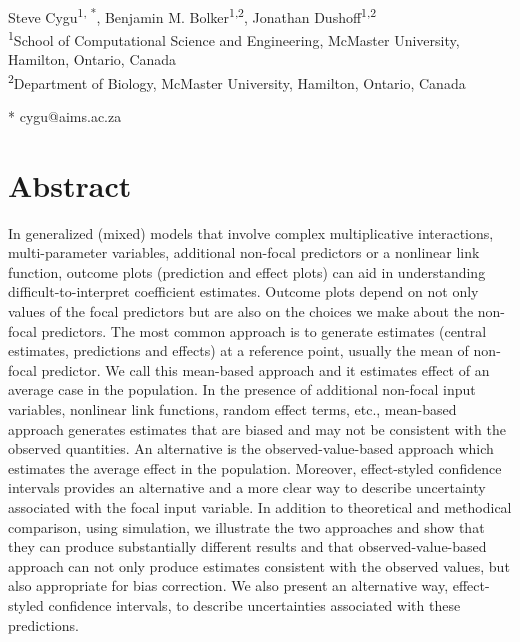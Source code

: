 \begin{flushleft}
{\Large
\textbf{} %
}
\newline
\\
Steve Cygu\textsuperscript{1, *},
Benjamin M. Bolker\textsuperscript{1,2},
Jonathan Dushoff\textsuperscript{1,2}
\\
\bigskip
\textsuperscript{1}School of Computational Science and Engineering, McMaster University, Hamilton, Ontario, Canada
\\
\textsuperscript{2}Department of Biology, McMaster University, Hamilton, Ontario, Canada
\\
\bigskip


* cygu@aims.ac.za

\end{flushleft}
\section*{Abstract}


In generalized (mixed) models that involve complex multiplicative interactions, multi-parameter variables, additional non-focal predictors or a nonlinear link function, outcome plots (prediction and effect plots) can aid in understanding difficult-to-interpret coefficient estimates. Outcome plots depend on not only values of the focal predictors but are also on the choices we make about the non-focal predictors.
The most common approach is to generate estimates (central estimates, predictions and effects) at a reference point, usually the mean of non-focal predictor. We call this mean-based approach and it estimates effect of an average case in the population. In the presence of additional non-focal input variables, nonlinear link functions, random effect terms, etc., mean-based approach generates estimates that are biased and may not be consistent with the observed quantities. An alternative is the observed-value-based approach which estimates the average effect in the population. Moreover, effect-styled confidence intervals provides an alternative and a more clear way to describe uncertainty associated with the focal input variable. In addition to theoretical and methodical comparison, using simulation, we illustrate the two approaches and show that they can produce substantially different results and that observed-value-based approach can not only produce estimates consistent with the observed values, but also appropriate for bias correction. We also present an alternative way, effect-styled confidence intervals, to describe uncertainties associated with these predictions.

